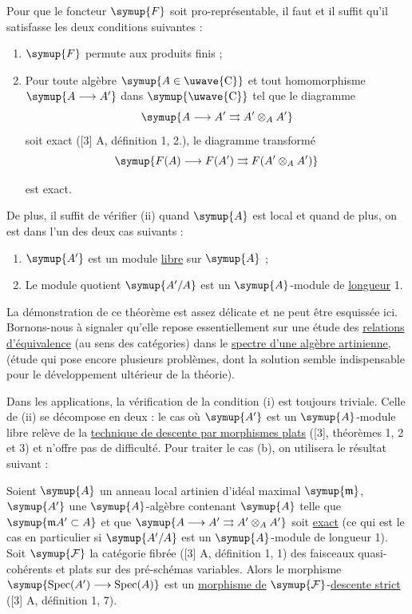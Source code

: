  Pour que le foncteur $\symup{F}$ soit pro-représentable, il faut
et il suffit qu'il satisfasse les deux conditions suivantes :
\begin{enumerate}
\item[i.] $\symup{F}$ permute aux produits finis ;
\item[ii.] Pour toute algèbre $\symup{A\in\text{\uwave{C}}}$ et tout homomorphisme
$\symup{A\longrightarrow A'}$ dans $\symup{\text{\uwave{C}}}$ tel que le diagramme
\[
  \symup{A\longrightarrow A'\rightrightarrows A'\otimes_A A'}
\]
soit exact ([3] A, définition 1, 2.), le diagramme transformé
\[
  \symup{F(A)\longrightarrow F(A')\rightrightarrows F(A'\otimes_A A')}
\]

est exact.
\end{enumerate}
De plus, il suffit de vérifier (ii) quand $\symup{A}$ est local et quand de plus, on est
dans l'un des deux cas suivants :
\begin{enumerate}
\item[a.] $\symup{A'}$ est un module \uline{libre} sur $\symup{A}$ ;
\item[b.] Le module quotient $\symup{A'/A}$ est un $\symup{A}$-module de \uline{longueur} 1.
\end{enumerate}

La démonstration de ce théorème est assez délicate et ne peut être esquissée
ici. Bornons-nous à signaler qu'elle repose essentiellement sur une étude des
\uline{relations d'équivalence} (au sens des catégories) dans le \uline{spectre d'une algèbre artinienne}, (étude qui pose encore plusieurs problèmes, dont la solution semble
indispensable pour le développement ultérieur de la théorie).

Dans les applications, la vérification de la condition (i) est toujours
triviale. Celle de (ii) se décompose en deux : le cas où $\symup{A'}$ est un
$\symup{A}$-module libre relève de la \uline{technique de descente par morphismes plats} ([3],
théorèmes 1, 2 et 3) et n'offre pas de difficulté. Pour traiter le cas (b), on
utilisera le résultat suivant :

 Soient $\symup{A}$ un anneau local artinien d'idéal maximal
$\symup{\mathfrak m}$, $\symup{A'}$ une $\symup{A}$-algèbre contenant $\symup{A}$ telle que
$\symup{\mathfrak mA'\subset A}$ et que $\symup{A\longrightarrow A'\rightrightarrows A'\otimes_A A'}$ soit \uline{exact} (ce qui est le cas en particulier si $\symup{A'/A}$ est un $\symup{A}$-module de
longueur 1). Soit $\symup{\mathcal F}$ la catégorie fibrée ([3] A, définition 1, 1)
des faisceaux quasi-cohérents et plats sur des pré-schémas variables. Alors le
morphisme $\symup{\operatorname{Spec}(A')\longrightarrow\operatorname{Spec}(A)}$ est
un \uline{morphisme de} $\symup{\mathcal F}$-\uline{descente strict} ([3] A, définition 1, 7).

